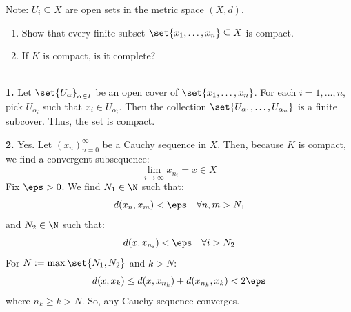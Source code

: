 \setcounter{section}{\value{tempSection}}
\setcounter{theorem}{\value{tempTheorem}}

\begin{center}
\end{center}
\textcolor{eGray}{Note: $U_i \subseteq X$ are open sets in the metric space $(X,d)$.}

\vspace{0.5cm}

\begin{exercises}
\begin{enumerate}
    \item Show that every finite subset $\set{x_1, \dots, x_n} \subseteq X$ is compact.
    \item If $K$ is compact, is it complete?
\end{enumerate}
\end{exercises}

\begin{solution}\hfill\\ %
\textbf{1.} Let $\set{U_\alpha}_{\alpha \in I}$ be an open cover of $\set{x_1, \dots, x_n}$. For each $i=1, \dots, n$, pick $U_{\alpha_i}$ such that $x_i \in U_{\alpha_i}$. 
Then the collection $\set{U_{\alpha_1}, \dots, U_{\alpha_n}}$ is a finite subcover. Thus, the set is compact.

\vspace{0.3cm}
\textbf{2.} \textcolor{eDarkGreen}{Yes.} Let $(x_n)_{n=0}^\infty$ be a Cauchy sequence in $X$. Then, because $K$ is compact, we find a convergent subsequence:
\[ \lim_{i \to \infty} x_{n_i} = x \in X \]
Fix $\eps > 0$. We find $N_1 \in \N$ such that:
\[ d(x_n, x_m) < \eps \quad \forall n, m > N_1 \]
and $N_2 \in \N$ such that:
\[ d(x, x_{n_i}) < \eps \quad \forall i > N_2 \]
For $N := \max\set{N_1, N_2}$ and $k > N$:
\[ d(x, x_k) \le d(x, x_{n_k}) + d(x_{n_k}, x_k) < 2\eps \]
where $n_k \ge k > N$. So, any Cauchy sequence converges.
\end{solution}